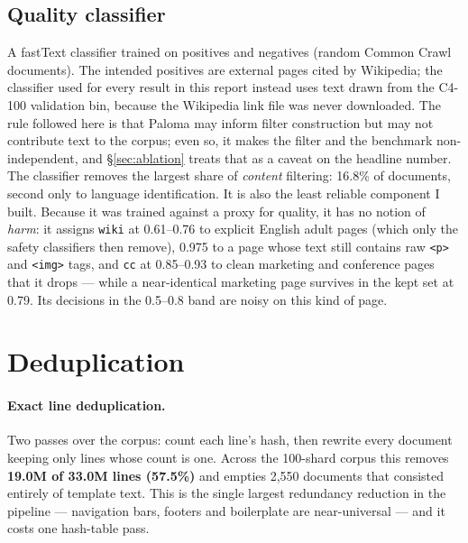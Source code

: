 \documentclass{article}
\begin{document}
\subsection{Quality classifier}
\label{sec:quality_clf}
A fastText classifier trained on positives and negatives (random Common Crawl documents). The
intended positives are external pages cited by Wikipedia; the classifier used for every result
in this report instead uses text drawn from the C4-100 validation bin, because the Wikipedia
link file was never downloaded. The rule followed here is that Paloma may inform filter
construction but may not contribute text to the corpus; even so, it makes the filter and the
benchmark non-independent, and §\ref{sec:ablation} treats that as a caveat on the headline
number. The classifier removes the largest share of \emph{content} filtering: 16.8\% of
documents, second only to language identification. It is also the least reliable component I
built. Because it was trained against a proxy for quality, it has no notion of \emph{harm}:
it assigns \texttt{wiki} at 0.61--0.76 to explicit English adult pages (which only the safety
classifiers then remove), 0.975 to a page whose text still contains raw \texttt{<p>} and
\texttt{<img>} tags, and \texttt{cc} at 0.85--0.93 to clean marketing and conference pages that
it drops --- while a near-identical marketing page survives in the kept set at 0.79. Its
decisions in the 0.5--0.8 band are noisy on this kind of page.

\section{Deduplication}
\label{sec:dedup}

\paragraph{Exact line deduplication.}
Two passes over the corpus: count each line's hash, then rewrite every document keeping only
lines whose count is one. Across the 100-shard corpus this removes \textbf{19.0M of 33.0M
lines (57.5\%)} and empties 2{,}550 documents that consisted entirely of template text. This is
the single largest redundancy reduction in the pipeline --- navigation bars, footers and
boilerplate are near-universal --- and it costs one hash-table pass.
\end{document}
